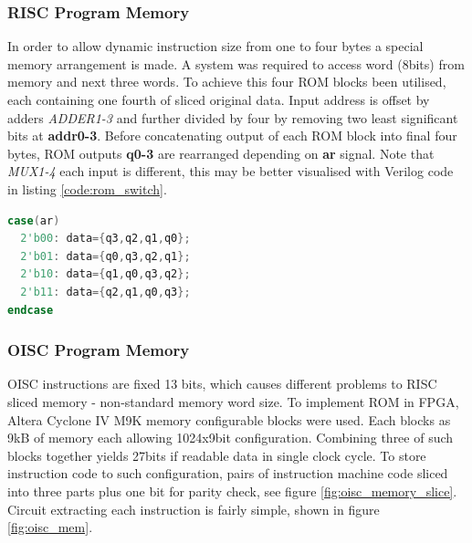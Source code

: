 \subsubsection{RISC Program Memory}
In order to allow dynamic instruction size from one to four bytes a special memory arrangement is made. A system was required to access word (8bits) from memory and next three words. To achieve this four ROM blocks been utilised, each containing one fourth of sliced original data. Input address is offset by adders \textit{ADDER1-3} and further divided by four by removing two least significant bits at \textbf{addr0-3}. 
Before concatenating output of each ROM block into final four bytes, ROM outputs \textbf{q0-3} are rearranged depending on \textbf{ar} signal. Note that \textit{MUX1-4} each input is different, this may be better visualised with Verilog code in listing \ref{code:rom_switch}.



\begin{blockpage}
\begin{lstlisting}[frame=single, language=Verilog, caption={RISC sliced ROM memory multiplexer arrangement Verilog code}, emph={ar, data}, label=code:rom_switch]
case(ar)
  2'b00: data={q3,q2,q1,q0};
  2'b01: data={q0,q3,q2,q1};
  2'b10: data={q1,q0,q3,q2};
  2'b11: data={q2,q1,q0,q3};
endcase
\end{lstlisting}
\end{blockpage}

\subsubsection{OISC Program Memory}\label{subsec:oisc_mem}
OISC instructions are fixed 13 bits, which causes different problems to RISC sliced memory - non-standard memory word size. To implement ROM in FPGA, Altera Cyclone IV M9K memory configurable blocks were used. Each blocks as 9kB of memory each allowing 1024x9bit configuration. Combining three of such blocks together yields 27bits if readable data in single clock cycle. To store instruction code to such configuration, pairs of instruction machine code sliced into three parts plus one bit for parity check, see figure \ref{fig:oisc_memory_slice}. Circuit extracting each instruction is fairly simple, shown in figure \ref{fig:oisc_mem}.

